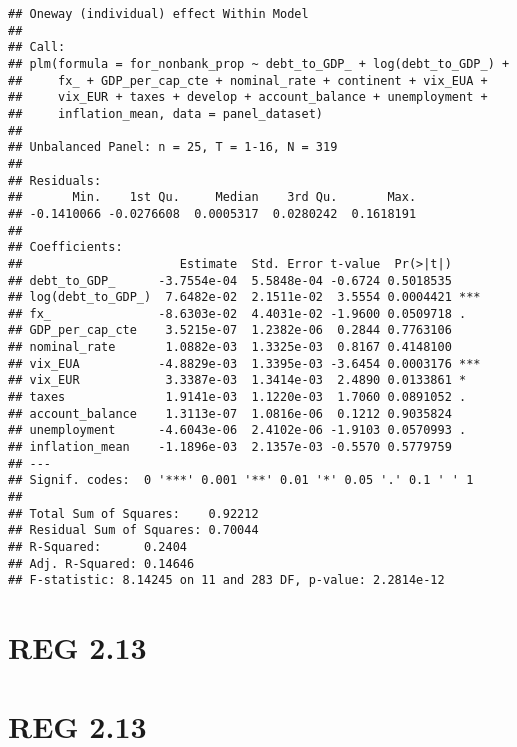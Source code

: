 \documentclass[]{article}
\begin{document}
\begin{verbatim}
## Oneway (individual) effect Within Model
## 
## Call:
## plm(formula = for_nonbank_prop ~ debt_to_GDP_ + log(debt_to_GDP_) + 
##     fx_ + GDP_per_cap_cte + nominal_rate + continent + vix_EUA + 
##     vix_EUR + taxes + develop + account_balance + unemployment + 
##     inflation_mean, data = panel_dataset)
## 
## Unbalanced Panel: n = 25, T = 1-16, N = 319
## 
## Residuals:
##       Min.    1st Qu.     Median    3rd Qu.       Max. 
## -0.1410066 -0.0276608  0.0005317  0.0280242  0.1618191 
## 
## Coefficients:
##                      Estimate  Std. Error t-value  Pr(>|t|)    
## debt_to_GDP_      -3.7554e-04  5.5848e-04 -0.6724 0.5018535    
## log(debt_to_GDP_)  7.6482e-02  2.1511e-02  3.5554 0.0004421 ***
## fx_               -8.6303e-02  4.4031e-02 -1.9600 0.0509718 .  
## GDP_per_cap_cte    3.5215e-07  1.2382e-06  0.2844 0.7763106    
## nominal_rate       1.0882e-03  1.3325e-03  0.8167 0.4148100    
## vix_EUA           -4.8829e-03  1.3395e-03 -3.6454 0.0003176 ***
## vix_EUR            3.3387e-03  1.3414e-03  2.4890 0.0133861 *  
## taxes              1.9141e-03  1.1220e-03  1.7060 0.0891052 .  
## account_balance    1.3113e-07  1.0816e-06  0.1212 0.9035824    
## unemployment      -4.6043e-06  2.4102e-06 -1.9103 0.0570993 .  
## inflation_mean    -1.1896e-03  2.1357e-03 -0.5570 0.5779759    
## ---
## Signif. codes:  0 '***' 0.001 '**' 0.01 '*' 0.05 '.' 0.1 ' ' 1
## 
## Total Sum of Squares:    0.92212
## Residual Sum of Squares: 0.70044
## R-Squared:      0.2404
## Adj. R-Squared: 0.14646
## F-statistic: 8.14245 on 11 and 283 DF, p-value: 2.2814e-12
\end{verbatim}

\section{REG 2.13}\label{reg-2.13}

\section{REG 2.13}\label{reg-2.13-1}
\end{document}
